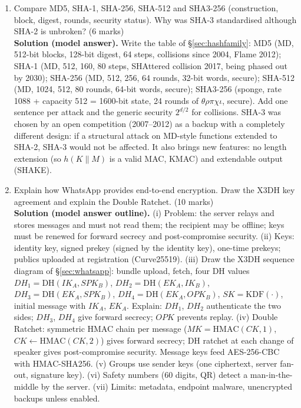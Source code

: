 \begin{enumerate}[leftmargin=1.6em,itemsep=4pt]
  \item Compare MD5, SHA-1, SHA-256, SHA-512 and SHA3-256 (construction, block, digest, rounds, security status). Why was SHA-3 standardised although SHA-2 is unbroken? \hfill(6 marks)\\
  \textbf{Solution (model answer).} Write the table of \S\ref{sec:hashfamily}: MD5 (MD, 512-bit blocks, 128-bit digest, 64 steps, collisions since 2004, Flame 2012); SHA-1 (MD, 512, 160, 80 steps, SHAttered collision 2017, being phased out by 2030); SHA-256 (MD, 512, 256, 64 rounds, 32-bit words, secure); SHA-512 (MD, 1024, 512, 80 rounds, 64-bit words, secure); SHA3-256 (sponge, rate 1088 + capacity 512 = 1600-bit state, 24 rounds of $\theta\rho\pi\chi\iota$, secure). Add one sentence per attack and the generic security $2^{d/2}$ for collisions. SHA-3 was chosen by an open competition (2007--2012) as a backup with a completely different design: if a structural attack on MD-style functions extended to SHA-2, SHA-3 would not be affected. It also brings new features: no length extension (so $h(K \| M)$ is a valid MAC, KMAC) and extendable output (SHAKE).

  \item Explain how WhatsApp provides end-to-end encryption. Draw the X3DH key agreement and explain the Double Ratchet. \hfill(10 marks)\\
  \textbf{Solution (model answer outline).} (i) Problem: the server relays and stores messages and must not read them; the recipient may be offline; keys must be renewed for forward secrecy and post-compromise security. (ii) Keys: identity key, signed prekey (signed by the identity key), one-time prekeys; publics uploaded at registration (Curve25519). (iii) Draw the X3DH sequence diagram of \S\ref{sec:whatsapp}: bundle upload, fetch, four DH values $DH_1 = \mathrm{DH}(IK_A, SPK_B)$, $DH_2 = \mathrm{DH}(EK_A, IK_B)$, $DH_3 = \mathrm{DH}(EK_A, SPK_B)$, $DH_4 = \mathrm{DH}(EK_A, OPK_B)$, $SK = \mathrm{KDF}(\cdot)$, initial message with $IK_A$, $EK_A$. Explain: $DH_1$, $DH_2$ authenticate the two sides; $DH_3$, $DH_4$ give forward secrecy; $OPK$ prevents replay. (iv) Double Ratchet: symmetric HMAC chain per message ($MK = \mathrm{HMAC}(CK, 1)$, $CK \leftarrow \mathrm{HMAC}(CK, 2)$) gives forward secrecy; DH ratchet at each change of speaker gives post-compromise security. Message keys feed AES-256-CBC with HMAC-SHA256. (v) Groups use sender keys (one ciphertext, server fan-out, signature key). (vi) Safety numbers (60 digits, QR) detect a man-in-the-middle by the server. (vii) Limits: metadata, endpoint malware, unencrypted backups unless enabled.


\end{enumerate}

